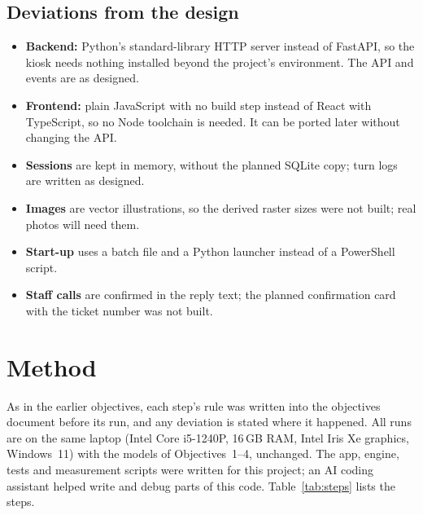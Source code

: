 \documentclass[11pt,a4paper]{article}
\begin{document}
\subsection{Deviations from the design}
\begin{itemize}
  \item \textbf{Backend:} Python's standard-library HTTP server instead of FastAPI, so the kiosk needs nothing installed
        beyond the project's environment. The API and events are as designed.
  \item \textbf{Frontend:} plain JavaScript with no build step instead of React with TypeScript, so no Node toolchain is
        needed. It can be ported later without changing the API.
  \item \textbf{Sessions} are kept in memory, without the planned SQLite copy; turn logs are written as designed.
  \item \textbf{Images} are vector illustrations, so the derived raster sizes were not built; real photos will need them.
  \item \textbf{Start-up} uses a batch file and a Python launcher instead of a PowerShell script.
  \item \textbf{Staff calls} are confirmed in the reply text; the planned confirmation card with the ticket number was not
        built.
\end{itemize}

\section{Method}\label{sec:method}
As in the earlier objectives, each step's rule was written into the objectives document before its run, and any deviation
is stated where it happened. All runs are on the same laptop (Intel Core i5-1240P, 16\,GB RAM, Intel Iris Xe graphics,
Windows~11) with the models of Objectives~1--4, unchanged. The app, engine, tests and measurement scripts were written
for this project; an AI coding assistant helped write and debug parts of this code. Table~\ref{tab:steps} lists the
steps.
\end{document}
